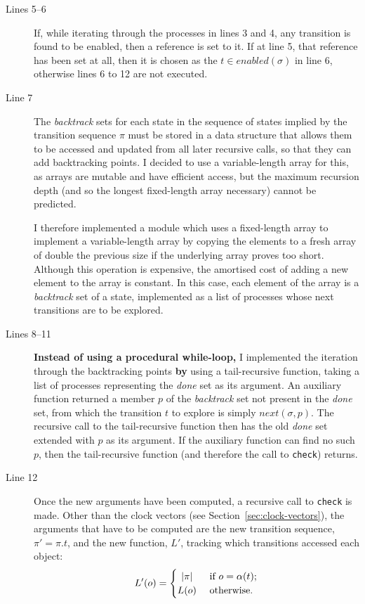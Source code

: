 \documentclass[12pt,a4paper,twoside,openright]{report}
\begin{document}
\begin{description}
	\item[Lines 5--6] If, while iterating through the
	processes in lines 3 and 4, any transition is found to be
	enabled, then a reference is set to it. If at line 5,
	that reference has been set at all, then it is chosen
	as the $t \in \textit{enabled}(\sigma)$ in line 6,
	otherwise lines 6 to 12 are not executed.

	\item[Line 7] The \textit{backtrack} sets for each state
	in the sequence of states implied by the transition
	sequence $\pi$ must be stored in a data structure that
	allows them to be accessed and updated from all later
	recursive calls, so that they can add backtracking
	points. I decided to use a variable-length array
	for this, as arrays are mutable and have efficient
	access, but the maximum recursion depth (and so the
	longest fixed-length array necessary) cannot be predicted.
	
	I therefore implemented a module which uses a fixed-length
	array to implement a variable-length array by
	copying the elements to a fresh array of double the
	previous size if the underlying array proves too short.
	Although this operation is expensive, the amortised
	cost of adding a new element to the array is constant.
	In this case, each element of the array is a \textit{backtrack}
	set of a state, implemented as a list of processes
	whose next transitions are to be explored.
	
	\item[Lines 8--11] \textbf{Instead of using a
	procedural while-loop,}
	I implemented the iteration through
	the backtracking points
	\textbf{by} using a tail-recursive
	function, taking a list of processes
	representing the \textit{done} set as
	its argument. An auxiliary
	function returned a member $p$ of the
	\textit{backtrack} set not present in the
	\textit{done} set, from which the
	transition $t$ to explore is simply
	$\textit{next}(\sigma, p)$. The
	recursive call to the tail-recursive function
	then has the old \textit{done} set
	extended with $p$ as its argument. If
	the auxiliary function can
	find no such $p$, then the
	tail-recursive function (and therefore the
	call to \texttt{check}) returns.

	\item[Line 12] Once the new arguments have
	been computed, a recursive call to
	\texttt{check} is made. Other than
	the clock vectors (see Section~\ref{sec:clock-vectors}),
	the arguments that
	have to be computed are the new transition
	sequence, $\pi' = \pi.t$,
	and the new function, $L'$,
	tracking which transitions accessed each 
	object:
	\[ L'(o) =
	\begin{cases}
		\hfill |\pi| \hfill & \text{ if } o = \alpha(t); \\
		\hfill L(o) \hfill & \text{ otherwise}.
	\end{cases}\]


\end{description}
\end{document}
